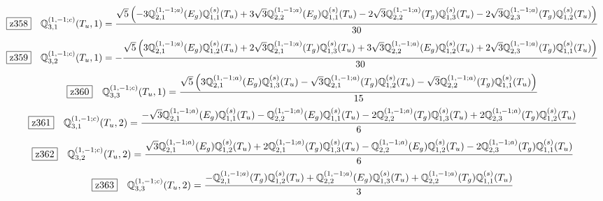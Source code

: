 \documentclass[fleqn,10pt,landscape]{jsarticle}
\begin{document}
\begin{dmath*}
\hspace*{3mm}\fbox{z358}\quad \mathbb{Q}_{3,1}^{(1,-1;c)}(T_{u},1)=\frac{\sqrt{5} \left(- 3 \mathbb{Q}_{2,1}^{(1,-1;a)}(E_{g}) \mathbb{Q}_{1,1}^{(s)}(T_{u}) + 3 \sqrt{3} \mathbb{Q}_{2,2}^{(1,-1;a)}(E_{g}) \mathbb{Q}_{1,1}^{(s)}(T_{u}) - 2 \sqrt{3} \mathbb{Q}_{2,2}^{(1,-1;a)}(T_{g}) \mathbb{Q}_{1,3}^{(s)}(T_{u}) - 2 \sqrt{3} \mathbb{Q}_{2,3}^{(1,-1;a)}(T_{g}) \mathbb{Q}_{1,2}^{(s)}(T_{u})\right)}{30}
\end{dmath*}
\begin{dmath*}
\hspace*{3mm}\fbox{z359}\quad \mathbb{Q}_{3,2}^{(1,-1;c)}(T_{u},1)=- \frac{\sqrt{5} \left(3 \mathbb{Q}_{2,1}^{(1,-1;a)}(E_{g}) \mathbb{Q}_{1,2}^{(s)}(T_{u}) + 2 \sqrt{3} \mathbb{Q}_{2,1}^{(1,-1;a)}(T_{g}) \mathbb{Q}_{1,3}^{(s)}(T_{u}) + 3 \sqrt{3} \mathbb{Q}_{2,2}^{(1,-1;a)}(E_{g}) \mathbb{Q}_{1,2}^{(s)}(T_{u}) + 2 \sqrt{3} \mathbb{Q}_{2,3}^{(1,-1;a)}(T_{g}) \mathbb{Q}_{1,1}^{(s)}(T_{u})\right)}{30}
\end{dmath*}
\begin{dmath*}
\hspace*{3mm}\fbox{z360}\quad \mathbb{Q}_{3,3}^{(1,-1;c)}(T_{u},1)=\frac{\sqrt{5} \left(3 \mathbb{Q}_{2,1}^{(1,-1;a)}(E_{g}) \mathbb{Q}_{1,3}^{(s)}(T_{u}) - \sqrt{3} \mathbb{Q}_{2,1}^{(1,-1;a)}(T_{g}) \mathbb{Q}_{1,2}^{(s)}(T_{u}) - \sqrt{3} \mathbb{Q}_{2,2}^{(1,-1;a)}(T_{g}) \mathbb{Q}_{1,1}^{(s)}(T_{u})\right)}{15}
\end{dmath*}
\begin{dmath*}
\hspace*{3mm}\fbox{z361}\quad \mathbb{Q}_{3,1}^{(1,-1;c)}(T_{u},2)=\frac{- \sqrt{3} \mathbb{Q}_{2,1}^{(1,-1;a)}(E_{g}) \mathbb{Q}_{1,1}^{(s)}(T_{u}) - \mathbb{Q}_{2,2}^{(1,-1;a)}(E_{g}) \mathbb{Q}_{1,1}^{(s)}(T_{u}) - 2 \mathbb{Q}_{2,2}^{(1,-1;a)}(T_{g}) \mathbb{Q}_{1,3}^{(s)}(T_{u}) + 2 \mathbb{Q}_{2,3}^{(1,-1;a)}(T_{g}) \mathbb{Q}_{1,2}^{(s)}(T_{u})}{6}
\end{dmath*}
\begin{dmath*}
\hspace*{3mm}\fbox{z362}\quad \mathbb{Q}_{3,2}^{(1,-1;c)}(T_{u},2)=\frac{\sqrt{3} \mathbb{Q}_{2,1}^{(1,-1;a)}(E_{g}) \mathbb{Q}_{1,2}^{(s)}(T_{u}) + 2 \mathbb{Q}_{2,1}^{(1,-1;a)}(T_{g}) \mathbb{Q}_{1,3}^{(s)}(T_{u}) - \mathbb{Q}_{2,2}^{(1,-1;a)}(E_{g}) \mathbb{Q}_{1,2}^{(s)}(T_{u}) - 2 \mathbb{Q}_{2,3}^{(1,-1;a)}(T_{g}) \mathbb{Q}_{1,1}^{(s)}(T_{u})}{6}
\end{dmath*}
\begin{dmath*}
\hspace*{3mm}\fbox{z363}\quad \mathbb{Q}_{3,3}^{(1,-1;c)}(T_{u},2)=\frac{- \mathbb{Q}_{2,1}^{(1,-1;a)}(T_{g}) \mathbb{Q}_{1,2}^{(s)}(T_{u}) + \mathbb{Q}_{2,2}^{(1,-1;a)}(E_{g}) \mathbb{Q}_{1,3}^{(s)}(T_{u}) + \mathbb{Q}_{2,2}^{(1,-1;a)}(T_{g}) \mathbb{Q}_{1,1}^{(s)}(T_{u})}{3}
\end{dmath*}
\end{document}
